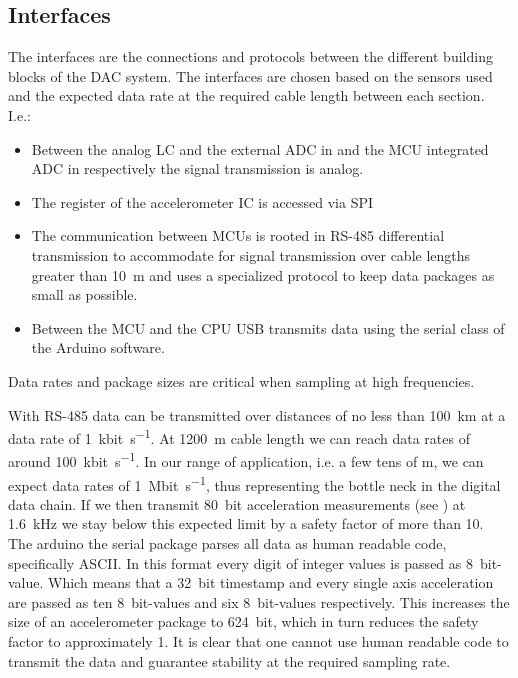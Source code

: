 \subsection{Interfaces}

The interfaces are the connections and protocols between the different building blocks of the \ac{DAC} system. The interfaces are chosen based on the sensors used and the expected data rate at the required cable length between each section. I.e.:

\begin{itemize}
    \item Between the analog \ac{LC} and the external \ac{ADC} in  and the \ac{MCU} integrated \ac{ADC}  in  respectively the signal transmission is analog.
    \item The register of the accelerometer \ac{IC} is accessed via \ac{SPI}
    \item The communication between \acs{MCU}s is rooted in \acs{RS}-485 differential transmission to accommodate for signal transmission over cable lengths greater than \SI{10}{\meter} and uses a specialized protocol to keep data packages as small as possible.
    \item Between the \ac{MCU} and the \ac{CPU} \ac{USB} transmits data using the serial class of the Arduino software.
\end{itemize}

Data rates and package sizes are critical when sampling at high frequencies. 

With \ac{RS}-485 data can be transmitted over distances of no less than \SI{100}{\km} at a data rate of \SI{1}{\kilo bit\per\second}. At \SI{1200}{\meter} cable length we can reach data rates of around \SI{100}{\kilo bit\per\second}. In our range of application, i.e. a few tens of \si{\meter}, we can expect data rates of \SI{1}{\mega bit\per\second}, thus representing the bottle neck in the digital data chain. If we then transmit \SI{80}{bit} acceleration measurements (see ) at \SI{1.6}{\kilo\hertz} we stay below this expected limit by a safety factor of more than 10.
The arduino the serial package parses all data as human readable code, specifically \acf{ASCII}. In this format every digit of integer values is passed as \SI{8}{bit}-value. Which means that a \SI{32}{bit} timestamp and every single axis acceleration are passed as ten \SI{8}{bit}-values and six \SI{8}{bit}-values respectively. This increases the size of an accelerometer package to \SI{624}{bit}, which in turn reduces the safety factor to approximately 1.
It is clear that one cannot use human readable code to transmit the data and guarantee stability at the required sampling rate.


